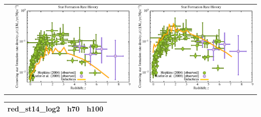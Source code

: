 \documentclass[a4paper,11pt,fleqn,oneside]{book}
\begin{document}
\begin{itemize}
\begin{table}[p]
\begin{tabular}{l|c|c}
 & \includegraphics[scale=0.5]{r256/h70/red_st14_log1/Plot_Star_Formation_History.pdf} & \includegraphics[scale=0.5]{r256/h100/red_st14_log1/Plot_Star_Formation_History.pdf} \\
\end{tabular}
\end{table}
\begin{table}[p]
\centering
\begin{tabular}{l|c|c}
 red\_st14\_log2 & h70 & h100 \\
\hline 

\end{tabular}
\end{table}
\end{itemize}
\end{document}
